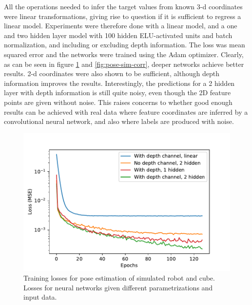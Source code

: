 All the operations needed to infer the target values from known 3-d coordinates
were linear transformations, giving rise to question if it is sufficient to
regress a linear model. Experiments were therefore done with a linear model,
and a one and two hidden layer model with 100 hidden ELU-activated units and
batch normalization, and including or excluding depth information. The loss was
mean squared error and the networks were trained using the Adam optimizer.
Clearly, as can be seen in figure \ref{fig:pose-sim-losses} and
\ref{fig:pose-sim-corr}, deeper networks achieve better results. 2-d
coordinates were also shown to be sufficient, although depth information
improves the results. Interestingly, the predictions for a 2 hidden layer with
depth information is still quite noisy, even though the 2D feature points are
given without noise. This raises concerns to whether good enough results can be
achieved with real data where feature coordinates are inferred by a
convolutional neural network, and also where labels are produced with noise.

\begin{figure}[h!]
    \centering
    \includegraphics[width=0.7 \textwidth]{res/pose_sim_losses.pdf}

    \caption{Training losses for pose estimation of simulated robot and cube.
    Losses for neural networks given different parametrizations and input
    data.}

    \label{fig:pose-sim-losses}
    
\end{figure}

